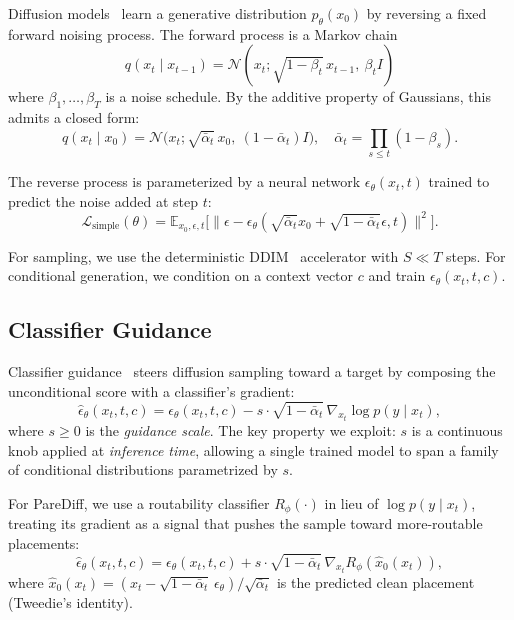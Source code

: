 \documentclass{ieeeaccess}
\begin{document}
Diffusion models~\cite{sohl2015deep, ho2020ddpm} learn a generative distribution $p_\theta(x_0)$ by reversing a fixed forward noising process. The forward process is a Markov chain
\begin{equation}
q(x_t \mid x_{t-1}) = \mathcal{N}(x_t; \sqrt{1 - \beta_t}\, x_{t-1},\ \beta_t I)
\end{equation}
where $\beta_1, \dots, \beta_T$ is a noise schedule. By the additive property of Gaussians, this admits a closed form:
\begin{equation}
q(x_t \mid x_0) = \mathcal{N}\!\big(x_t; \sqrt{\bar{\alpha}_t}\, x_0,\ (1 - \bar{\alpha}_t) I\big), \quad \bar{\alpha}_t = \prod_{s \le t}\!(1 - \beta_s).
\end{equation}

The reverse process is parameterized by a neural network $\epsilon_\theta(x_t, t)$ trained to predict the noise added at step $t$:
\begin{equation}
\mathcal{L}_\textrm{simple}(\theta) = \mathbb{E}_{x_0, \epsilon, t}\!\big[\|\epsilon - \epsilon_\theta\!\left(\sqrt{\bar{\alpha}_t}x_0 \!+\! \sqrt{1\!-\!\bar{\alpha}_t}\epsilon, t\right)\!\|^2\big]\!.
\label{eq:ddpm_loss}
\end{equation}

For sampling, we use the deterministic DDIM~\cite{song2021ddim} accelerator with $S \ll T$ steps. For conditional generation, we condition on a context vector $c$ and train $\epsilon_\theta(x_t, t, c)$.

\subsection{Classifier Guidance}

Classifier guidance~\cite{dhariwal2021guidance} steers diffusion sampling toward a target by composing the unconditional score with a classifier's gradient:
\begin{equation}
\hat{\epsilon}_\theta(x_t, t, c) = \epsilon_\theta(x_t, t, c) - s \cdot \sqrt{1 - \bar{\alpha}_t}\, \nabla_{x_t}\!\log p(y \mid x_t),
\label{eq:guidance}
\end{equation}
where $s \ge 0$ is the \emph{guidance scale}. The key property we exploit: $s$ is a continuous knob applied at \emph{inference time}, allowing a single trained model to span a family of conditional distributions parametrized by $s$.

For PareDiff, we use a routability classifier $R_\phi(\cdot)$ in lieu of $\log p(y \mid x_t)$, treating its gradient as a signal that pushes the sample toward more-routable placements:
\begin{equation}
\hat{\epsilon}_\theta(x_t, t, c) = \epsilon_\theta(x_t, t, c) + s \cdot \sqrt{1 - \bar{\alpha}_t}\, \nabla_{x_t}\!R_\phi(\hat{x}_0(x_t)),
\label{eq:rout_guidance}
\end{equation}
where $\hat{x}_0(x_t) = (x_t - \sqrt{1 - \bar{\alpha}_t}\, \epsilon_\theta) / \sqrt{\bar{\alpha}_t}$ is the predicted clean placement (Tweedie's identity).
\end{document}
